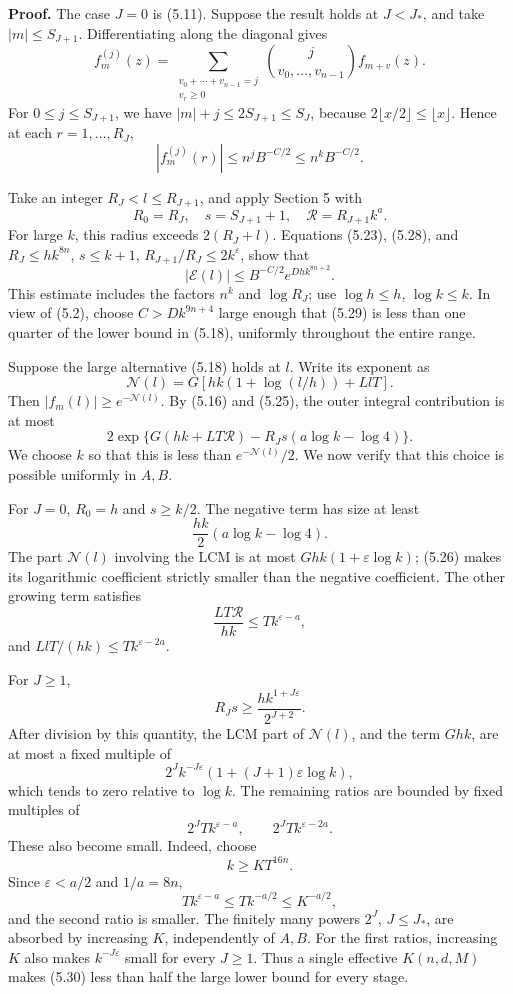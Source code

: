 \documentclass[
  11pt,
  a4paper,
]{article}
\begin{document}
\textbf{Proof.} The case \(J=0\) is (5.11). Suppose the result holds at
\(J<J_*\), and take \(|m|\le S_{J+1}\). Differentiating along the
diagonal gives \[
f_m^{(j)}(z)=
\sum_{\substack{v_0+\cdots+v_{n-1}=j\\v_r\ge0}}
\binom{j}{v_0,\ldots,v_{n-1}} f_{m+v}(z).
\] For \(0\le j\le S_{J+1}\), we have \(|m|+j\le2S_{J+1}\le S_J\),
because \(2\lfloor x/2\rfloor\le\lfloor x\rfloor\). Hence at each
\(r=1,\ldots,R_J\), \[
|f_m^{(j)}(r)|\le n^jB^{-C/2}\le n^kB^{-C/2}. \tag{5.28}
\]

Take an integer \(R_J<l\le R_{J+1}\), and apply Section 5 with \[
R_0=R_J,\quad s=S_{J+1}+1,\quad
\mathcal R=R_{J+1}k^a.
\] For large \(k\), this radius exceeds \(2(R_J+l)\). Equations (5.23),
(5.28), and \(R_J\le hk^{8n}\), \(s\le k+1\),
\(R_{J+1}/R_J\le2k^\varepsilon\), show that \[
|\mathcal E(l)|\le B^{-C/2}e^{Dhk^{8n+2}}. \tag{5.29}
\] This estimate includes the factors \(n^k\) and \(\log R_J\); use
\(\log h\le h\), \(\log k\le k\). In view of (5.2), choose
\(C>Dk^{9n+4}\) large enough that (5.29) is less than one quarter of the
lower bound in (5.18), uniformly throughout the entire range.

Suppose the large alternative (5.18) holds at \(l\). Write its exponent
as \[
\mathcal N(l)=G[hk(1+\log(l/h))+LlT].
\] Then \(|f_m(l)|\ge e^{-\mathcal N(l)}\). By (5.16) and (5.25), the
outer integral contribution is at most \[
2\exp\{G(hk+LT\mathcal R)-R_Js(a\log k-\log4)\}. \tag{5.30}
\] We choose \(k\) so that this is less than \(e^{-\mathcal N(l)}/2\).
We now verify that this choice is possible uniformly in \(A,B\).

For \(J=0\), \(R_0=h\) and \(s\ge k/2\). The negative term has size at
least \[
\frac{hk}{2}(a\log k-\log4).
\] The part \(\mathcal N(l)\) involving the LCM is at most
\(Ghk(1+\varepsilon\log k)\); (5.26) makes its logarithmic coefficient
strictly smaller than the negative coefficient. The other growing term
satisfies \[
\frac{LT\mathcal R}{hk}
\le Tk^{\varepsilon-a},
\] and \(LlT/(hk)\le Tk^{\varepsilon-2a}\).

For \(J\ge1\), \[
R_Js\ge \frac{hk^{1+J\varepsilon}}{2^{J+2}}. \tag{5.31}
\] After division by this quantity, the LCM part of \(\mathcal N(l)\),
and the term \(Ghk\), are at most a fixed multiple of \[
2^Jk^{-J\varepsilon}(1+(J+1)\varepsilon\log k),
\] which tends to zero relative to \(\log k\). The remaining ratios are
bounded by fixed multiples of \[
2^JTk^{\varepsilon-a},\qquad
2^JTk^{\varepsilon-2a}. \tag{5.32}
\] These also become small. Indeed, choose \[
k\ge K T^{16n}. \tag{5.33}
\] Since \(\varepsilon<a/2\) and \(1/a=8n\), \[
Tk^{\varepsilon-a}\le Tk^{-a/2}\le K^{-a/2},
\] and the second ratio is smaller. The finitely many powers \(2^J\),
\(J\le J_*\), are absorbed by increasing \(K\), independently of
\(A,B\). For the first ratios, increasing \(K\) also makes
\(k^{-J\varepsilon}\) small for every \(J\ge1\). Thus a single effective
\(K(n,d,M)\) makes (5.30) less than half the large lower bound for every
stage.
\end{document}
